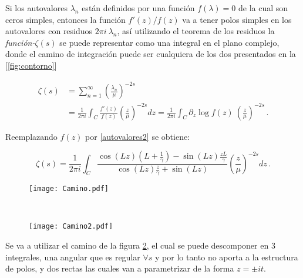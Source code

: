 Si los  autovalores $\lambda _n$ están definidos por una función $f( \lambda  ) = 0$ de la cual son ceros simples, entonces la función $f'(z) / f(z) $ va a tener polos simples en los autovalores con residuos $2 \pi i \ \lambda _n$, así utilizando el teorema de los residuos la  {\it función-$\zeta (s)$} se puede representar como una integral en el plano complejo, donde el camino de integración puede ser cualquiera de los dos presentados en la [\ref{fig:contorno}]

\begin{equation}
\begin{aligned}
   \zeta  (s) &=  \sum _{n=1} ^{\infty} \left( \frac{\lambda _n}{\mu} \right) ^{-2s} \\[5pt] &=  
   \frac{1}{2 \pi i} \int _{C} \frac{f'(z)}{f(z)} \left( \frac{z}{\mu} \right) ^{-2s} dz 
   =  \frac{1}{2 \pi i} \int _{C} \partial _z \log f(z) \ 
	   \left( \frac{z}{\mu} \right) ^{-2s} \, .
\end{aligned}
\label{asd}
\end{equation}

Reemplazando $f(z)$ por  \ref{autovalores2} se obtiene:

\begin{equation}
	\zeta  (s) = 
    \frac{1}{2 \pi i} \int _{C}
    \frac{ \cos (L z) \left(L + \frac{1}{\gamma} \right) - \sin(L z) \frac{z L}{\gamma}
    }
    { \cos(L z) \frac{z}{\gamma} + \sin(L z)
    }
    \left( \frac{z}{\mu} \right) ^{-2 s} dz  \, .
\end{equation}


\begin{figure*}[t!]
    \centering
    \begin{subfigure}[t]{0.5\textwidth}
        \centering
        \texttt{[image: Camino.pdf]}
        \caption{}
        \label{fig.izquierda}
    \end{subfigure}%
    ~ 
    \begin{subfigure}[t]{0.5\textwidth}
        \centering
        \texttt{[image: Camino2.pdf]}
        \caption{}
        \label{fig.derecha}
    \end{subfigure}
    \caption{Estos caminos son los tenidos en cuenta para representar a la {\it función-$\zeta$} como una integral en el plano complejo.}
\label{fig:contorno}
\end{figure*}


Se va a utilizar el camino de la figura \ref{fig.derecha}, el cual se puede descomponer en 3 integrales, una angular que es regular $ \forall s$ y por lo tanto no aporta a la estructura de polos, y dos rectas las cuales van a parametrizar de la forma $z = \pm i  t$. 

